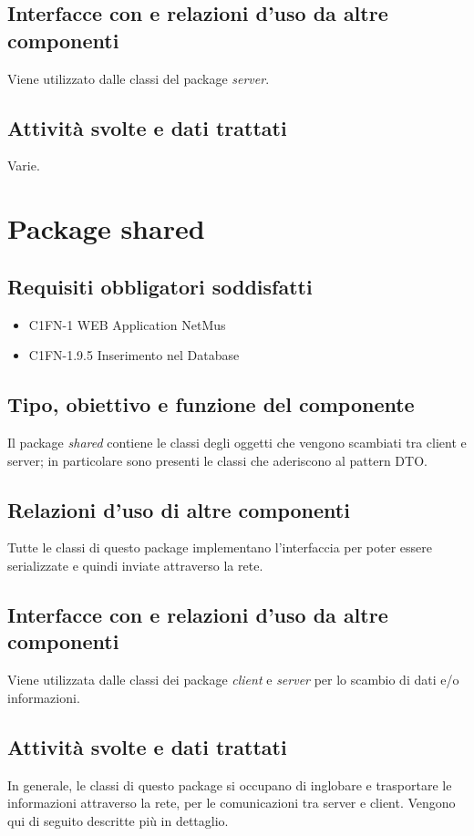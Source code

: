 \subsection*{Interfacce con e relazioni d'uso da altre componenti}
Viene utilizzato dalle classi del package \emph{server}.
\subsection*{Attivit\`a svolte e dati trattati}
Varie.

\newpage
\section{Package shared}
\subsection*{Requisiti obbligatori soddisfatti}
\begin{itemize}
  	\item C1FN-1 WEB Application NetMus
	\item C1FN-1.9.5 Inserimento nel Database
\end{itemize}
\subsection*{Tipo, obiettivo e funzione del componente}
Il package \emph{shared} contiene le classi degli oggetti che vengono
scambiati tra client e server; in particolare sono presenti le classi che
aderiscono al pattern DTO.
\subsection*{Relazioni d'uso di altre componenti}
Tutte le classi di questo package implementano l'interfaccia
 per poter essere serializzate e quindi inviate
attraverso la rete. 
\subsection*{Interfacce con e relazioni d'uso da altre componenti}
Viene utilizzata dalle classi dei package \emph{client} e \emph{server} per
lo scambio di dati e/o informazioni.
\subsection*{Attivit\`a svolte e dati trattati}
In generale, le classi di questo package si occupano di inglobare e trasportare
le informazioni attraverso la rete, per le comunicazioni tra server e client.
Vengono qui di seguito descritte pi\`u in dettaglio.

